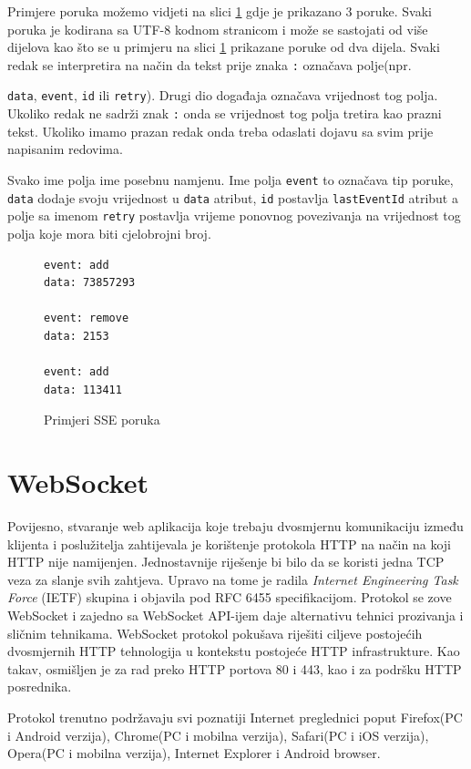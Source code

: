 \documentclass[times, utf8, zavrsni]{fer}
\begin{document}
Primjere poruka možemo vidjeti na slici \ref{lst:sse-messages} gdje je prikazano 3 poruke. Svaki poruka je kodirana sa UTF-8 kodnom stranicom i može se sastojati od više dijelova kao što se u primjeru na slici \ref{lst:sse-messages} prikazane poruke od dva dijela. Svaki redak se interpretira na način da tekst prije znaka {\tt :} označava polje(npr. {{\tt data}, {\tt event}, {\tt id} ili {\tt retry}). Drugi dio događaja označava vrijednost tog polja. Ukoliko redak ne sadrži znak {\tt :} onda se vrijednost tog polja tretira kao prazni tekst. Ukoliko imamo prazan redak onda treba odaslati dojavu sa svim prije napisanim redovima.

Svako ime polja ime posebnu namjenu. Ime polja {\tt event} to označava tip poruke, {\tt data} dodaje svoju vrijednost u {\tt data} atribut, {\tt id} postavlja {\tt lastEventId} atribut a polje sa imenom {\tt retry} postavlja vrijeme ponovnog povezivanja na vrijednost tog polja koje mora biti cjelobrojni broj.\citep{sse2017}

\begin{figure}
\begin{lstlisting}
event: add
data: 73857293

event: remove
data: 2153

event: add
data: 113411
\end{lstlisting}
\caption{Primjeri SSE poruka}
\label{lst:sse-messages}
\end{figure}

\section{WebSocket}
Povijesno, stvaranje web aplikacija koje trebaju dvosmjernu komunikaciju između klijenta i poslužitelja zahtijevala je korištenje protokola HTTP na način na koji HTTP nije namijenjen. Jednostavnije riješenje bi bilo da se koristi jedna TCP veza za slanje svih zahtjeva. Upravo na tome je radila {\em Internet Engineering Task Force} (IETF) skupina i objavila pod RFC 6455 specifikacijom. Protokol se zove WebSocket i zajedno sa WebSocket API-ijem daje alternativu tehnici prozivanja i sličnim tehnikama. WebSocket protokol pokušava riješiti ciljeve postojećih dvosmjernih HTTP tehnologija u kontekstu postojeće HTTP infrastrukture. Kao takav, osmišljen je za rad preko HTTP portova 80 i 443, kao i za podršku HTTP posrednika.

Protokol trenutno podržavaju svi poznatiji Internet preglednici poput Firefox(PC i Android verzija), Chrome(PC i mobilna verzija), Safari(PC i iOS verzija), Opera(PC i mobilna verzija), Internet Explorer i Android browser.

}
\end{document}
